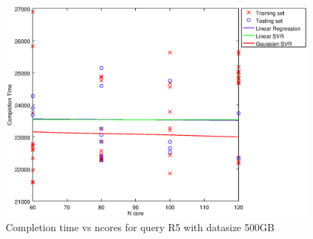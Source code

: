 
\begin {figure}[hbtp]
\centering
\includegraphics[width=\textwidth]{output/R5_500_LINEAR_NCORE/plot_R5_500_bestmodels.eps}
\caption{Completion time vs ncores for query R5 with datasize 500GB}
\label{fig:coreonly_linear_R5_500}
\end {figure}

